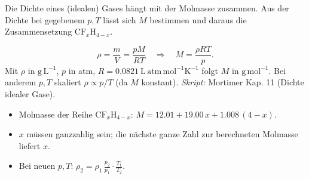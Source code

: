 

Die Dichte eines (idealen) Gases h\"angt mit der Molmasse zusammen. Aus der
Dichte bei gegebenem $p,T$ l\"asst sich $M$ bestimmen und daraus die
Zusammensetzung $\mathrm{CF}_x\mathrm{H}_{4-x}$.

\begin{werkzeugkasten}
\[
  \rho = \frac{m}{V} = \frac{pM}{RT}
  \quad\Longrightarrow\quad
  M = \frac{\rho RT}{p}.
\]
Mit $\rho$ in $\mathrm{g\,L^{-1}}$, $p$ in atm, $R=0.0821\ \mathrm{L\,atm\,mol^{-1}K^{-1}}$
folgt $M$ in $\mathrm{g\,mol^{-1}}$. Bei anderem $p,T$ skaliert $\rho
\propto p/T$ (da $M$ konstant).
\textit{Skript:} Mortimer Kap. 11 (Dichte idealer Gase).
\end{werkzeugkasten}

\begin{achtung}
\begin{itemize}
  \item Molmasse der Reihe $\mathrm{CF}_x\mathrm{H}_{4-x}$:
        $M = 12.01 + 19.00\,x + 1.008\,(4-x)$.
  \item $x$ m\"ussen ganzzahlig sein; die n\"achste ganze Zahl zur berechneten
        Molmasse liefert $x$.
  \item Bei neuen $p,T$: $\rho_2 = \rho_1\,\frac{p_2}{p_1}\cdot\frac{T_1}{T_2}$.
\end{itemize}
\end{achtung}

